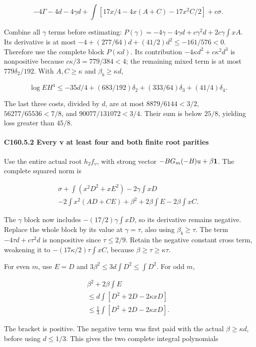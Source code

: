 \[
-4\Gamma-4d-4\gamma d
+\int[17x/4-4x(A+C)-17x^2C/2]+c\sigma.
\]

Combine all \(\gamma\) terms before estimating: \(P(\gamma)=-4\gamma-4\gamma d+c\gamma^2d+2c\gamma\int xA\). Its derivative is at most \(-4+(277/64)d+(41/2)d^2\le-161/576<0\). Therefore use the complete block \(P(\kappa d)\). Its contribution \(-4\kappa d^2+c\kappa^2d^3\) is nonpositive because \(c\kappa/3=779/384<4\); the remaining mixed term is at most \(779\delta_2/192\). With \(A,\allowbreak \allowbreak  C\ge\kappa\) and \(\beta_b\ge\kappa d\),

\[
\log EH^4\le-35d/4+(683/192)\delta_2+(333/64)\delta_3+(41/4)\delta_4.
\]

The last three costs, divided by \(d\), are at most \(8879/6144<3/2\), \(56277/65536<7/8\), and \(90077/131072<3/4\). Their sum is below \(25/8\), yielding loss greater than \(45/8\).

\paragraph{C160.5.2 Every v at least four and both finite root parities}

Use the entire actual root \(h_2f_v\), with strong vector \(-BG_m(-B)u+\beta\mathbf1\). The complete squared norm is

\[
\begin{gathered}
\sigma+\int(x^2D^2+xE^2)-2\gamma\int xD\\
-2\int x^2(AD+CE)+\beta^2+2\beta\int E-2\beta\int xC.
\end{gathered}
\]

The \(\gamma\) block now includes \(-(17/2)\gamma\int xD\), so its derivative remains negative. Replace the whole block by its value at \(\gamma=\tau\), also using \(\beta_b\ge\tau\). The term \(-4\tau d+c\tau^2d\) is nonpositive since \(\tau\le2/9\). Retain the negative constant cross term, weakening it to \(-(17\kappa/2)\tau\int xC\), because \(\beta\ge\tau\ge\kappa\tau\).

For even \(m\), use \(E=D\) and \(3\beta^2\le3d\int D^2\le\int D^2\). For odd \(m\),

\[
\begin{gathered}
\beta^2+2\beta\int E\\
\le d\int[D^2+2D-2\kappa xD]\\
\le\tfrac13\int[D^2+2D-2\kappa xD].
\end{gathered}
\]

The bracket is positive. The negative term was first paid with the actual \(\beta\ge\kappa d\), before using \(d\le1/3\). This gives the two complete integral polynomials

